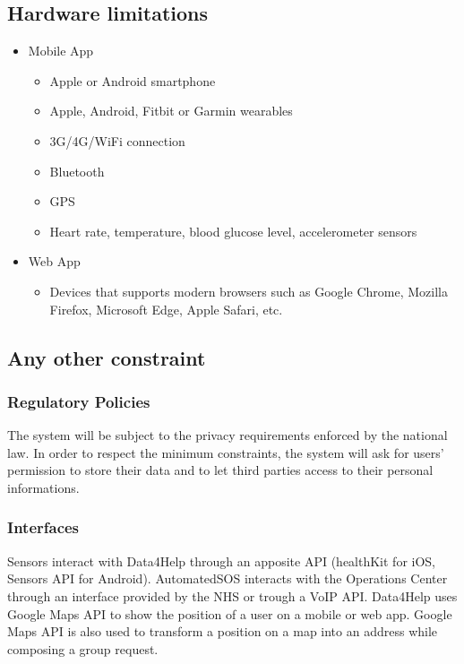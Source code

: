 \subsection{Hardware limitations}
\begin{itemize}
\item Mobile App
    \begin{itemize}
        \item Apple or Android smartphone
        \item Apple, Android, Fitbit or Garmin wearables
        \item 3G/4G/WiFi connection
        \item Bluetooth
        \item GPS
        \item Heart rate, temperature, blood glucose level, accelerometer sensors
    \end{itemize}
\item Web App
    \begin{itemize}
        \item Devices that supports modern browsers such as Google Chrome, Mozilla Firefox, Microsoft Edge, Apple Safari, etc.
    \end{itemize}
\end{itemize}
\subsection{Any other constraint}

\subsubsection{Regulatory Policies}
The system will be subject to the privacy requirements enforced by the national law. In order to respect the minimum constraints, the system will ask for users' permission to store their data and to let third parties access to their personal informations.

\subsubsection{Interfaces}
    Sensors interact with Data4Help through an apposite API (healthKit for iOS\cite{healthKit}, Sensors API for Android\cite{sensorsAPI}).
    AutomatedSOS interacts with the Operations Center through an interface provided by the NHS or trough a VoIP API.
    Data4Help uses Google Maps API to show the position of a user on a mobile or web app.
    Google Maps API is also used to transform a position on a map into an address while composing a group request.

